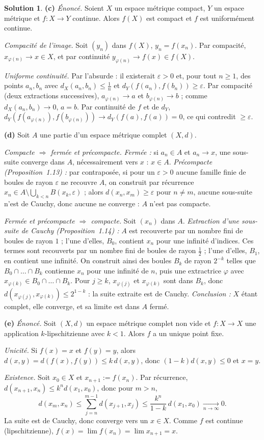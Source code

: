 \documentclass[11pt,a4paper]{article}
\theoremstyle{definition}
\newtheorem*{solution}{Solution}
\begin{document}
\begin{solution}
\medskip
\noindent\textbf{(c)} \emph{Énoncé.} Soient $X$ un espace métrique compact, $Y$ un espace métrique et $f:X\to Y$ continue. Alors $f(X)$ est compact et $f$ est uniformément continue.

\emph{Compacité de l'image.} Soit $(y_n)$ dans $f(X)$, $y_n=f(x_n)$. Par compacité, $x_{\varphi(n)}\to x\in X$, et par continuité $y_{\varphi(n)}\to f(x)\in f(X)$.

\emph{Uniforme continuité.} Par l'absurde : il existerait $\varepsilon>0$ et, pour tout $n\ge1$, des points $a_n,b_n$ avec $d_X(a_n,b_n)\le\frac1n$ et $d_Y(f(a_n),f(b_n))\ge\varepsilon$. Par compacité (deux extractions successives), $a_{\varphi(n)}\to a$ et $b_{\varphi(n)}\to b$ ; comme $d_X(a_n,b_n)\to0$, $a=b$. Par continuité de $f$ et de $d_Y$, $d_Y(f(a_{\varphi(n)}),f(b_{\varphi(n)}))\to d_Y(f(a),f(a))=0$, ce qui contredit $\ge\varepsilon$.

\medskip
\noindent\textbf{(d)} Soit $A$ une partie d'un espace métrique complet $(X,d)$.

\emph{Compacte $\Rightarrow$ fermée et précompacte.} \emph{Fermée :} si $a_n\in A$ et $a_n\to x$, une sous-suite converge dans $A$, nécessairement vers $x$ : $x\in A$. \emph{Précompacte (Proposition~1.13) :} par contraposée, si pour un $\varepsilon>0$ aucune famille finie de boules de rayon $\varepsilon$ ne recouvre $A$, on construit par récurrence $x_n\in A\setminus\bigcup_{k<n}B(x_k,\varepsilon)$ ; alors $d(x_n,x_m)\ge\varepsilon$ pour $n\ne m$, aucune sous-suite n'est de Cauchy, donc aucune ne converge : $A$ n'est pas compacte.

\emph{Fermée et précompacte $\Rightarrow$ compacte.} Soit $(x_n)$ dans $A$. \emph{Extraction d'une sous-suite de Cauchy (Proposition~1.14) :} $A$ est recouverte par un nombre fini de boules de rayon $1$ ; l'une d'elles, $B_0$, contient $x_n$ pour une infinité d'indices. Ces termes sont recouverts par un nombre fini de boules de rayon $\frac12$ ; l'une d'elles, $B_1$, en contient une infinité. On construit ainsi des boules $B_k$ de rayon $2^{-k}$ telles que $B_0\cap\dots\cap B_k$ contienne $x_n$ pour une infinité de $n$, puis une extractrice $\varphi$ avec $x_{\varphi(k)}\in B_0\cap\dots\cap B_k$. Pour $j\ge k$, $x_{\varphi(j)}$ et $x_{\varphi(k)}$ sont dans $B_k$, donc $d(x_{\varphi(j)},x_{\varphi(k)})\le2^{1-k}$ : la suite extraite est de Cauchy. \emph{Conclusion :} $X$ étant complet, elle converge, et sa limite est dans $A$ fermé.

\medskip
\noindent\textbf{(e)} \emph{Énoncé.} Soit $(X,d)$ un espace métrique complet non vide et $f:X\to X$ une application $k$-lipschitzienne avec $k<1$. Alors $f$ a un unique point fixe.

\emph{Unicité.} Si $f(x)=x$ et $f(y)=y$, alors $d(x,y)=d(f(x),f(y))\le k\,d(x,y)$, donc $(1-k)d(x,y)\le0$ et $x=y$.

\emph{Existence.} Soit $x_0\in X$ et $x_{n+1}:=f(x_n)$. Par récurrence, $d(x_{n+1},x_n)\le k^nd(x_1,x_0)$, donc pour $m>n$,
\[
d(x_m,x_n)\le\sum_{j=n}^{m-1}d(x_{j+1},x_j)\le\frac{k^n}{1-k}\,d(x_1,x_0)\xrightarrow[n\to\infty]{}0 .
\]
La suite est de Cauchy, donc converge vers un $x\in X$. Comme $f$ est continue (lipschitzienne), $f(x)=\lim f(x_n)=\lim x_{n+1}=x$.
\end{solution}
\end{document}
